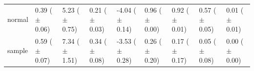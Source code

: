 \begin{tabular}{lllllllll}
normal & \makecell{0.39 \\ ($\pm$ 0.06)} & \makecell{5.23 \\ ($\pm$ 0.75)} & \makecell{0.21 \\ ($\pm$ 0.03)} & \makecell{-4.04 \\ ($\pm$ 0.14)} & \makecell{0.96 \\ ($\pm$ 0.00)} & \makecell{0.92 \\ ($\pm$ 0.01)} & \makecell{0.57 \\ ($\pm$ 0.05)} & \makecell{0.01 \\ ($\pm$ 0.01)} \\
sample & \makecell{0.59 \\ ($\pm$ 0.07)} & \makecell{7.34 \\ ($\pm$ 1.51)} & \makecell{0.34 \\ ($\pm$ 0.08)} & \makecell{-3.53 \\ ($\pm$ 0.28)} & \makecell{0.26 \\ ($\pm$ 0.20)} & \makecell{0.17 \\ ($\pm$ 0.17)} & \makecell{0.05 \\ ($\pm$ 0.08)} & \makecell{0.00 \\ ($\pm$ 0.00)} \\
\bottomrule
\end{tabular}
